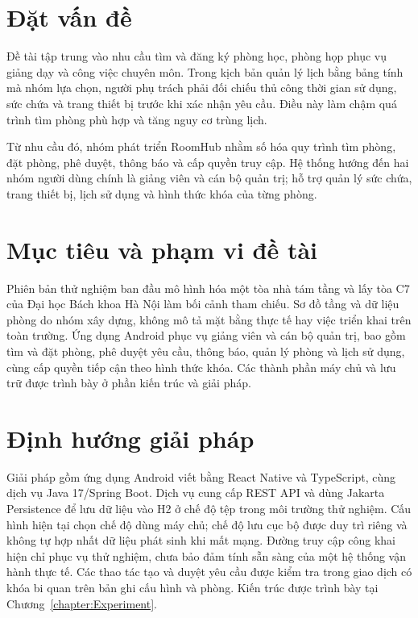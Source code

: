 \documentclass[../DoAn.tex]{subfiles}
\begin{document}
\section{Đặt vấn đề}
\label{section:1.1}
Đề tài tập trung vào nhu cầu tìm và đăng ký phòng học, phòng họp phục vụ giảng dạy và công việc chuyên môn. Trong kịch bản quản lý lịch bằng bảng tính mà nhóm lựa chọn, người phụ trách phải đối chiếu thủ công thời gian sử dụng, sức chứa và trang thiết bị trước khi xác nhận yêu cầu. Điều này làm chậm quá trình tìm phòng phù hợp và tăng nguy cơ trùng lịch.

Từ nhu cầu đó, nhóm phát triển RoomHub nhằm số hóa quy trình tìm phòng, đặt phòng, phê duyệt, thông báo và cấp quyền truy cập. Hệ thống hướng đến hai nhóm người dùng chính là giảng viên và cán bộ quản trị; hỗ trợ quản lý sức chứa, trang thiết bị, lịch sử dụng và hình thức khóa của từng phòng.

\section{Mục tiêu và phạm vi đề tài}
\label{section:1.2}
Phiên bản thử nghiệm ban đầu mô hình hóa một tòa nhà tám tầng và lấy tòa C7 của Đại học Bách khoa Hà Nội làm bối cảnh tham chiếu. Sơ đồ tầng và dữ liệu phòng do nhóm xây dựng, không mô tả mặt bằng thực tế hay việc triển khai trên toàn trường. Ứng dụng Android phục vụ giảng viên và cán bộ quản trị, bao gồm tìm và đặt phòng, phê duyệt yêu cầu, thông báo, quản lý phòng và lịch sử dụng, cùng cấp quyền tiếp cận theo hình thức khóa. Các thành phần máy chủ và lưu trữ được trình bày ở phần kiến trúc và giải pháp.

\section{Định hướng giải pháp}
\label{section:1.3}
Giải pháp gồm ứng dụng Android viết bằng React Native và TypeScript, cùng dịch vụ Java 17/Spring Boot. Dịch vụ cung cấp REST API và dùng Jakarta Persistence để lưu dữ liệu vào H2 ở chế độ tệp trong môi trường thử nghiệm. Cấu hình hiện tại chọn chế độ dùng máy chủ; chế độ lưu cục bộ được duy trì riêng và không tự hợp nhất dữ liệu phát sinh khi mất mạng. Đường truy cập công khai hiện chỉ phục vụ thử nghiệm, chưa bảo đảm tính sẵn sàng của một hệ thống vận hành thực tế. Các thao tác tạo và duyệt yêu cầu được kiểm tra trong giao dịch có khóa bi quan trên bản ghi cấu hình và phòng. Kiến trúc được trình bày tại Chương~\ref{chapter:Experiment}.
\end{document}
